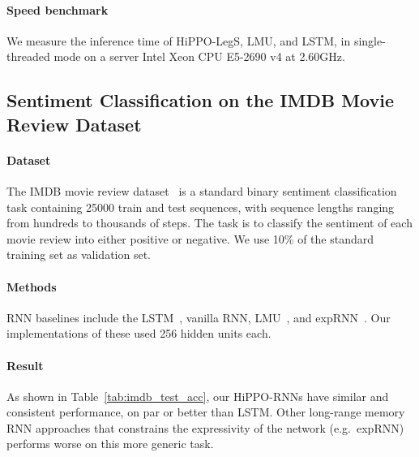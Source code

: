 \documentclass[../hippo.tex]{subfiles}
\begin{document}
\paragraph{Speed benchmark}
We measure the inference time of HiPPO-LegS, LMU, and LSTM, in
single-threaded mode on a server Intel Xeon CPU E5-2690 v4 at 2.60GHz.


\subsection{Sentiment Classification on the IMDB Movie Review Dataset}
\label{sec:imdb}

\paragraph{Dataset} The IMDB movie review
dataset~\citep{maas-EtAl:2011:ACL-HLT2011} is a standard binary sentiment
classification task containing 25000 train and test sequences, with sequence
lengths ranging from hundreds to thousands of steps.
The task is to classify the sentiment of each movie review into either positive
or negative.
We use 10\% of the standard training set as validation set.

\paragraph{Methods}
RNN baselines include the LSTM~\citep{lstm}, vanilla RNN,
LMU~\citep{voelker2019legendre}, and expRNN~\citep{lezcano2019cheap}.
Our implementations of these used 256 hidden units each.

\paragraph{Result}
As shown in Table~\ref{tab:imdb_test_acc}, our HiPPO-RNNs have similar and consistent performance,
on par or better than LSTM.
Other long-range memory RNN approaches that constrains the expressivity of the
network (e.g.\ expRNN) performs worse on this more generic task.
\end{document}
